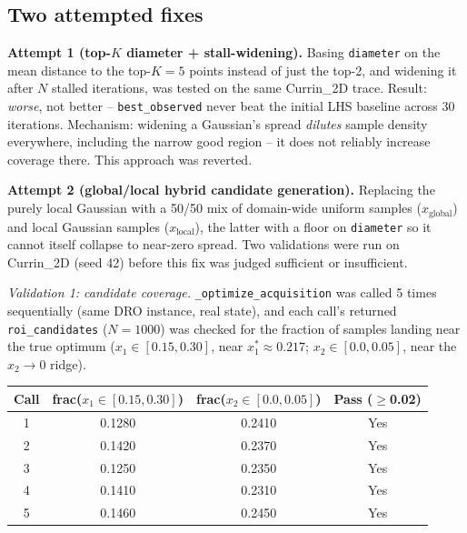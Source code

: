 \documentclass[11pt]{article}
\begin{document}
\subsection{Two attempted fixes}

\textbf{Attempt 1 (top-$K$ diameter + stall-widening).} Basing \texttt{diameter}
on the mean distance to the top-$K{=}5$ points instead of just the top-2, and
widening it after $N$ stalled iterations, was tested on the same Currin\_2D
trace. Result: \emph{worse}, not better -- \texttt{best\_observed} never beat
the initial LHS baseline across 30 iterations. Mechanism: widening a Gaussian's
spread \emph{dilutes} sample density everywhere, including the narrow good
region -- it does not reliably increase coverage there. This approach was
reverted.

\textbf{Attempt 2 (global/local hybrid candidate generation).} Replacing the
purely local Gaussian with a 50/50 mix of domain-wide uniform samples
($x_{\text{global}}$) and local Gaussian samples ($x_{\text{local}}$), the
latter with a floor on \texttt{diameter} so it cannot itself collapse to
near-zero spread. Two validations were run on Currin\_2D (seed 42) before this
fix was judged sufficient or insufficient.

\textit{Validation 1: candidate coverage.} \texttt{\_optimize\_acquisition} was
called 5 times sequentially (same DRO instance, real state), and each call's
returned \texttt{roi\_candidates} ($N=1000$) was checked for the fraction of
samples landing near the true optimum ($x_1 \in [0.15, 0.30]$, near
$x_1^*\approx0.217$; $x_2 \in [0.0, 0.05]$, near the $x_2\to0$ ridge).

\begin{center}
\begin{tabular}{cccc}
\toprule
\textbf{Call} & \textbf{frac($x_1\in[0.15,0.30]$)} & \textbf{frac($x_2\in[0.0,0.05]$)} & \textbf{Pass ($\geq$0.02)} \\
\midrule
1 & 0.1280 & 0.2410 & Yes \\
2 & 0.1420 & 0.2370 & Yes \\
3 & 0.1250 & 0.2350 & Yes \\
4 & 0.1410 & 0.2310 & Yes \\
5 & 0.1460 & 0.2450 & Yes \\
\bottomrule
\end{tabular}
\end{center}
\end{document}
